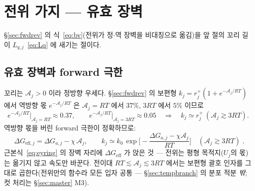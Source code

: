 \documentclass[11pt,a4paper]{article}
\newcommand{\eff}{\mathrm{eff}}
\begin{document}
\section{전위 가지 — 유효 장벽}\label{sec:potbranch}
\S\ref{sec:fwdrev} 의 식~\eqref{eq:bv}(전위가 정$\cdot$역 장벽을 비대칭으로 옮김)을 앞 절의 꼬리 길이 $L_{q,j}$~\eqref{eq:Lq} 에 새기는 절이다.

\subsection{유효 장벽과 forward 극한}
꼬리는 $\mathcal A_j>0$ 이라 정방향 우세다. \S\ref{sec:fwdrev} 의 보편형 $k_j=r_j^+(1+e^{-\mathcal A_j/RT})$ 에서 역방향 몫 $e^{-\mathcal A_j/RT}$ 은 $\mathcal A_j=RT$ 에서 $37\%$, $3RT$ 에서 $5\%$ 이므로
\begin{equation*}
e^{-\mathcal A_j/RT}\big|_{\mathcal A_j=RT}\approx0.37,\qquad
e^{-\mathcal A_j/RT}\big|_{\mathcal A_j=3RT}\approx0.05
\quad\Rightarrow\quad k_j\simeq r_j^+\ (\mathcal A_j\gtrsim3RT).
\end{equation*}
역방향 몫을 버린 forward 극한이 정확하므로:
\begin{equation}
\boxed{\;\Delta G_{\eff,j}=\Delta G_{a,j}-\chi\,\mathcal A_j,\qquad
k_j\simeq k_0\,\exp\!\Big[-\frac{\Delta G_{a,j}-\chi\mathcal A_j}{RT}\Big]
\quad(\mathcal A_j\gtrsim3RT)\;.}
\label{eq:keff}
\end{equation}
근본식~\eqref{eq:eyring} 의 장벽 자리에 $\Delta G_{\eff}$ 가 앉은 것 — 전위는 평형 목적지($U_j$의 몫)는 옮기지 않고 속도만 바꾼다. 전이대 $RT\lesssim\mathcal A_j\lesssim3RT$ 에서는 보편형 괄호 인자를 그대로 곱한다(전위만의 함수라 모든 입자 공통 — \S\ref{sec:tempbranch} 의 분포 적분 \emph{밖}; 컷 처리는 \S\ref{sec:master} M3).
\end{document}
